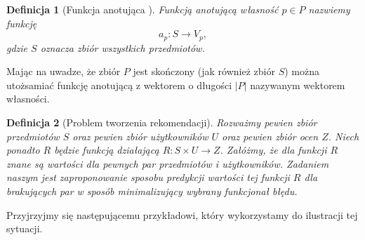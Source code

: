 \documentclass[12pt,a4paper]{report}
\newtheorem{df}{Definicja}[chapter]
\begin{document}
\begin{df}[Funkcja anotująca \citep{kidzinski}]
Funkcją anotującą własność $p \in P$ nazwiemy funkcję 
$$
a_p \colon S \to V_p,
$$
gdzie $S$ oznacza zbiór wszystkich przedmiotów.
\end{df}

Mając na uwadze, że zbiór $P$ jest skończony (jak również zbiór $S$) można utożsamiać funkcję anotującą z wektorem o długości $|P|$ nazywanym wektorem własności.

\begin{df}[Problem tworzenia rekomendacji]
Rozważmy pewien zbiór przedmiotów $S$ oraz pewien zbiór użytkowników $U$ oraz pewien zbiór ocen $Z$. Niech ponadto $R$ będzie funkcją działającą $ R: S \times U \to Z$. Załóżmy, że dla funkcji $R$ znane są wartości dla pewnych par przedmiotów i użytkowników. Zadaniem naszym jest zaproponowanie sposobu predykcji wartości tej funkcji $R$ dla brakujących par w sposób minimalizujący wybrany funkcjonał błędu. 
\end{df}

Przyjrzyjmy się następującemu przykładowi, który wykorzystamy do ilustracji tej sytuacji.
\end{document}
